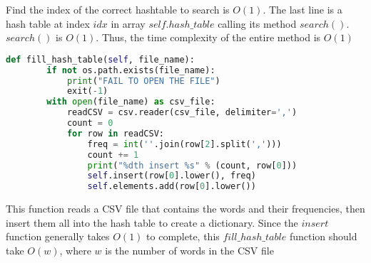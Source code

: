 \documentclass[10pt]{article}
\theoremstyle{definition}
\begin{document}
Find the index of the correct hashtable to search is $O(1)$. The last line is a hash table at index $idx$ in array $self.hash\_table$ calling its method $search()$. $search()$ is $O(1)$. Thus, the time complexity of the entire method is $O(1)$

\begin{lstlisting}[language=Python, basicstyle=\small]
    def fill_hash_table(self, file_name):
        if not os.path.exists(file_name):
            print("FAIL TO OPEN THE FILE")
            exit(-1)
        with open(file_name) as csv_file:
            readCSV = csv.reader(csv_file, delimiter=',')
            count = 0
            for row in readCSV:
                freq = int(''.join(row[2].split(',')))
                count += 1
                print("%dth insert %s" % (count, row[0]))
                self.insert(row[0].lower(), freq)
                self.elements.add(row[0].lower())
\end{lstlisting}

This function reads a CSV file that contains the words and their frequencies, then insert them all into the hash table to create a dictionary. Since the $insert$ function generally takes $O(1)$ to complete, this $fill\_hash\_table$ function should take $O(w)$, where $w$ is the number of words in the CSV file
\end{document}
